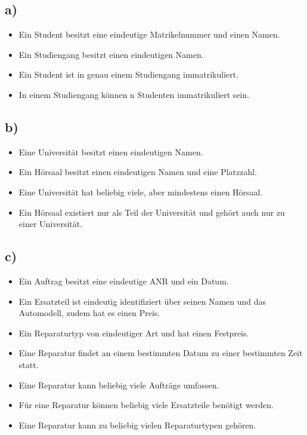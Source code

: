 \documentclass[a4paper,11pt,fleqn]{scrartcl}
\begin{document}
		\subsection*{a)}
			\begin{itemize}
				\item Ein Student besitzt eine eindeutige Matrikelnummer und einen Namen.
				\item Ein Studiengang besitzt einen eindeutigen Namen.
				\item Ein Student ist in genau einem Studiengang immatrikuliert.
				\item In einem Studiengang können n Studenten immatrikuliert sein.
			\end{itemize}

		\subsection*{b)}
			\begin{itemize}
				\item Eine Universität besitzt einen eindeutigen Namen.
				\item Ein Hörsaal besitzt einen eindeutigen Namen und eine Platzzahl.
				\item Eine Universität hat beliebig viele, aber mindestens einen Hörsaal.
				\item Ein Hörsaal existiert nur als Teil der Universität und gehört auch nur zu einer Universität.
			\end{itemize}

		\subsection*{c)}
			\begin{itemize}
				\item Ein Auftrag besitzt eine eindeutige ANR und ein Datum.
				\item Ein Ersatzteil ist eindeutig identifiziert über seinen Namen und das Automodell, zudem hat es einen Preis.
				\item Ein Reparaturtyp von eindeutiger Art und hat einen Festpreis.
				\item Eine Reparatur findet an einem bestimmten Datum zu einer bestimmten Zeit statt.
				\item Eine Reparatur kann beliebig viele Aufträge umfassen.
				\item Für eine Reparatur können beliebig viele Ersatzteile benötigt werden.
				\item Eine Reparatur kann zu beliebig vielen Reparaturtypen gehören.
			\end{itemize}
\end{document}
